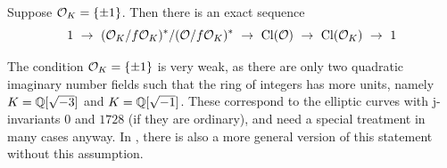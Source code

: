 \begin{corollary}
    \label{prop:class_group_order}
    Suppose $\mathcal{O}_K = \{ \pm 1 \}$. Then there is an exact sequence
    \begin{equation*}
        1 \ \to \ (\O_K/f\O_K)^*/(\O/f\O_K)^* \ \to \ \Cl(\O) \ \to \ \Cl(\O_K) \ \to \ 1
    \end{equation*}
\end{corollary}
The condition $\mathcal{O}_K = \{ \pm 1 \}$ is very weak, as there are only two quadratic imaginary number fields such that the ring of integers has more units, namely $K = \mathbb{Q}[\sqrt{-3}]$ and $K = \mathbb{Q}[\sqrt{-1}]$.
These correspond to the elliptic curves with j-invariants $0$ and $1728$ (if they are ordinary), and need a special treatment in many cases anyway.
In \cite{neukirch}, there is also a more general version of this statement without this assumption.


